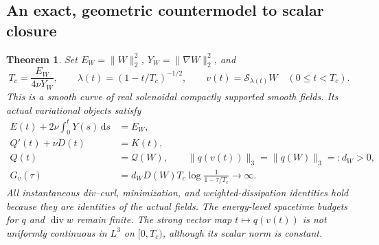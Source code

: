 \documentclass[11pt,a4paper]{article}
\newtheorem{theorem}{Theorem}[section]
\theoremstyle{definition}\newtheorem{definition}[theorem]{Definition}
\theoremstyle{remark}\newtheorem{remark}[theorem]{Remark}
\newcommand{\Q}{\mathcal Q}
\newcommand{\dd}{\,\mathrm d}
\newcommand{\norm}[1]{\lVert #1\rVert}
\newcommand{\diver}{\operatorname{div}}
\numberwithin{equation}{section}
\begin{document}
\subsection{An exact, geometric countermodel to scalar closure}
\begin{theorem}\label{thm:curve}
Set $E_W=\norm W_2^2$, $Y_W=\norm{\nabla W}_2^2$, and
\begin{equation}\label{eq:curve}
 T_c=\frac{E_W}{4\nu Y_W},\qquad
 \lambda(t)=(1-t/T_c)^{-1/2},\qquad
 v(t)=\mathscr S_{\lambda(t)}W\quad(0\le t<T_c).
\end{equation}
This is a smooth curve of real solenoidal compactly supported smooth fields. Its actual variational objects satisfy
\begin{align}
 E(t)+2\nu\int_0^tY(s)\dd s&=E_W,\label{eq:curveenergy}\\
 Q'(t)+\nu D(t)&=K(t),\label{eq:curveQ}\\
 Q(t)&=\Q(W),\qquad \norm{q(v(t))}_3=\norm{q(W)}_3=:d_W>0,\label{eq:curveconstant}\\
 G_v(\tau)&=d_WD(W)T_c\log\frac1{1-\tau/T_c}\longrightarrow\infty.\label{eq:curveG}
\end{align}
All instantaneous div--curl, minimization, and weighted-dissipation identities hold because they are identities of the actual fields. The energy-level spacetime budgets for $q$ and $\diver w$ remain finite. The strong vector map $t\mapsto q(v(t))$ is not uniformly continuous in $L^3$ on $[0,T_c)$, although its scalar norm is constant.
\end{theorem}
\end{document}
